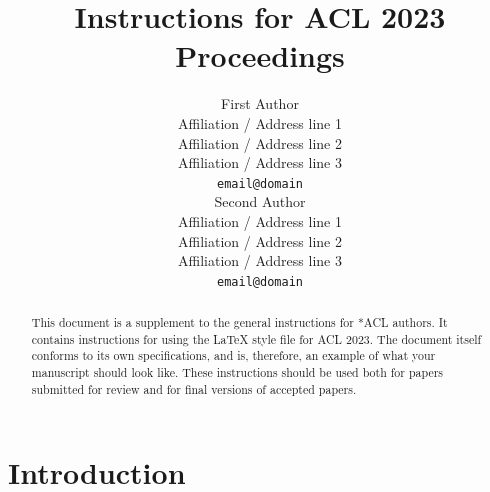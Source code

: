 \documentclass[11pt]{article}
\title{Instructions for ACL 2023 Proceedings}
\author{First Author \\
  Affiliation / Address line 1 \\
  Affiliation / Address line 2 \\
  Affiliation / Address line 3 \\
  \texttt{email@domain} \\\And
  Second Author \\
  Affiliation / Address line 1 \\
  Affiliation / Address line 2 \\
  Affiliation / Address line 3 \\
  \texttt{email@domain} \\}
\begin{document}
\maketitle
\begin{abstract}
This document is a supplement to the general instructions for *ACL authors. It contains instructions for using the \LaTeX{} style file for ACL 2023.
The document itself conforms to its own specifications, and is, therefore, an example of what your manuscript should look like.
These instructions should be used both for papers submitted for review and for final versions of accepted papers.
\end{abstract}

\section{Introduction}
\end{document}
